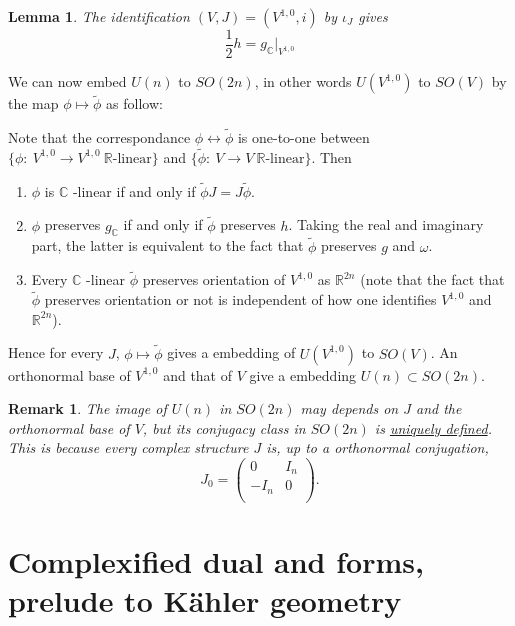 \documentclass[11pt]{article}
\newtheorem{remark}{Remark}
\newtheorem{lemma}[theorem]{Lemma}
\begin{document}
\begin{lemma}
The identification \((V,J) = (V^{1,0},i)\) by \(\iota_J\) gives
\[
\frac{1}{2}h = g_\mathbb{C}|_{V^{1,0}}
\]
\end{lemma}


We can now embed \(U(n)\) to \(SO(2n)\), in other words \(U(V^{1,0})\) to \(SO(V)\) by the map
\(\phi\mapsto \tilde\phi\) as follow:

Note that the correspondance \(\phi \leftrightarrow \tilde\phi\) is one-to-one between \(\{\phi:\
V^{1,0}\longrightarrow V^{1,0}\ \mathbb{R}\text{-linear}\}\) and \(\{\tilde\phi:\ V\longrightarrow V\
\mathbb{R}\text{-linear}\}\). Then
\begin{enumerate}
\item \(\phi\) is \(\mathbb{C}\) -linear if and only if \(\tilde\phi J = J\tilde\phi\).
\item \(\phi\) preserves \(g_{\mathbb{C}}\) if and only if \(\tilde\phi\) preserves \(h\). Taking the real
and imaginary part, the latter is equivalent to the fact that \(\tilde\phi\) preserves \(g\) and
\(\omega\).
\item Every \(\mathbb{C}\) -linear \(\tilde \phi\) preserves orientation of \(V^{1,0}\) as \(\mathbb{R}^{2n}\)
(note that the fact that \(\tilde\phi\) preserves orientation or not is independent of how one
identifies \(V^{1,0}\) and \(\mathbb{R}^{2n}\)).
\end{enumerate}
Hence for every \(J\), \(\phi\mapsto\tilde\phi\) gives a embedding of \(U(V^{1,0})\) to \(SO(V)\). An
orthonormal base of \(V^{1,0}\) and that of \(V\) give a embedding \(U(n)\subset SO(2n)\).

\begin{remark}
The image of \(U(n)\) in \(SO(2n)\) may depends on \(J\) and the orthonormal base of \(V\), but its
conjugacy class in \(SO(2n)\) is \uline{uniquely defined}. This is because every complex structure \(J\) is,
up to a orthonormal conjugation, 
\[
J_0 = \begin{pmatrix}
0 & I_n \\
-I_n & 0 \\
\end{pmatrix}.
\]
\end{remark}


\section{Complexified dual and forms, prelude to Kähler geometry}
\label{sec:org992de83}
\end{document}
